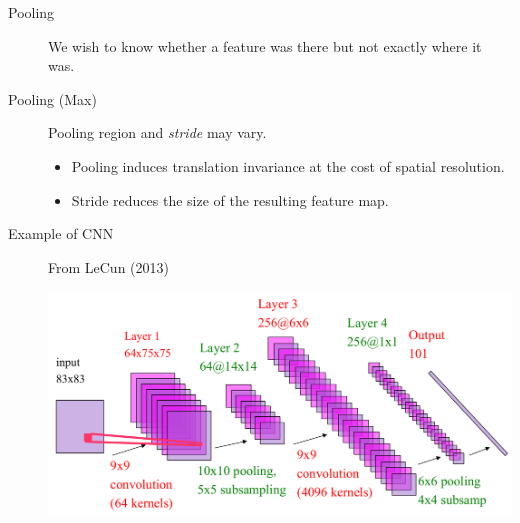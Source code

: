 \documentclass[10pt,landscape,a4paper]{article}
\begin{document}
\begin{multicols*}{3}
\begin{description}
	\item[Pooling] We wish to know whether a feature was there but not exactly where it was.
	\item[Pooling (Max)] Pooling region and {\it stride} may vary.
	\begin{itemize}
		\item Pooling induces translation invariance at the cost of spatial resolution.
		\item Stride reduces the size of the resulting feature map.
	\end{itemize}
	\begin{center}
	\end{center}
	\item[Example of CNN] From LeCun (2013)
	\begin{center}
		\includegraphics[width=\columnwidth]{cnn.png}
	\end{center}
\end{description}



\end{multicols*}
\end{document}
